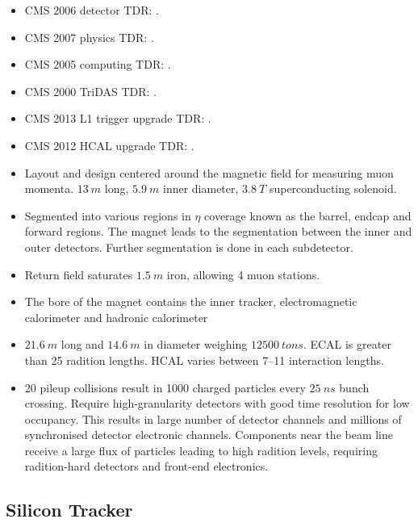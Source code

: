     \begin{itemize}
        \item CMS 2006 detector TDR: \cite{Bayatian:922757}.
        \item CMS 2007 physics TDR: \cite{Bayatian:942733}.
        \item CMS 2005 computing TDR: \cite{Bayatyan:838359}.
        \item CMS 2000 TriDAS TDR: \cite{Bayatyan:706847}.
        \item CMS 2013 L1 trigger upgrade TDR: \cite{Tapper:1556311}.
        \item CMS 2012 HCAL upgrade TDR: \cite{Mans:1481837}.
        \item Layout and design centered around the magnetic field for measuring
            muon momenta. ${\SI{13}{m}}$ long, ${\SI{5.9}{m}}$ inner diameter,
            ${\SI{3.8}{T}}$ superconducting solenoid.
        \item Segmented into various regions in $\eta$ coverage known as the barrel,
            endcap and forward regions. The magnet leads to the segmentation between
            the inner and outer detectors. Further segmentation is done in each
            subdetector.
        \item Return field saturates ${\SI{1.5}{m}}$ iron, allowing 4 muon stations.
        \item The bore of the magnet contains the inner tracker, electromagnetic
            calorimeter and hadronic calorimeter
        \item ${\SI{21.6}{m}}$ long and ${\SI{14.6}{m}}$ in diameter weighing
            ${\SI{12500}{tons}}$. ECAL is greater than 25 radition lengths. HCAL
            varies between 7--11 interaction lengths.
        \item 20 pileup collisions result in 1000 charged particles every
            ${\SI{25}{ns}}$ bunch crossing. Require high-granularity detectors
            with good time resolution for low occupancy. This results in large
            number of detector channels and millions of synchronised detector
            electronic channels. Components near the beam line receive a large
            flux of particles leading to high radition levels, requiring
            radition-hard detectors and front-end electronics.
    \end{itemize}

    \subsection{Silicon Tracker}

